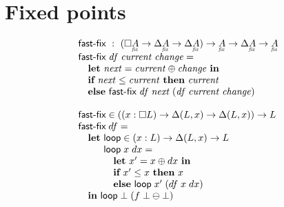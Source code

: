\documentclass{article}
\begin{document}



\section{Fixed points}

\[\begin{array}{l}
  \textsf{fast-fix} ~:~
  (\Disc{\fixtype{A}} \to \Ch\fixtype{A} \to \Ch\fixtype{A})
  \to \fixtype{A} \to \Ch\fixtype{A} \to \fixtype{A}\\
  \textsf{fast-fix}\; \mi{df}\; \mi{current}\; \mi{change} =\\
  \quad \textbf{let}~ {\mi{next} = \mi{current} \oplus \mi{change}}
  ~\textbf{in}\\
  \quad \textbf{if}~ \mi{next} \le \mi{current}
  ~\textbf{then}~ \mi{current}\\
  \quad \textbf{else}~ \textsf{fast-fix}\; \mi{df}\; \mi{next}
  \;(\mi{df}\; \mi{current}\; \mi{change})\\
  \\
  \textsf{fast-fix}
  \in ((x : \Disc{L}) \to \Delta(L, x) \to \Delta(L, x)) \to L
  \\
  \textsf{fast-fix} \; df =\\
  \quad\textbf{let}~ \textsf{loop} \in (x : L) \to \Delta(L, x) \to L\\
  \quad\phantom{\textbf{let}~} \textsf{loop} \;x \;dx =\\
  \quad\phantom{\textbf{let}~}\quad
  \textbf{let}~ x' = x \oplus dx ~\textbf{in}\\
  \quad\phantom{\textbf{let}~}\quad
  \textbf{if}~ x' \le x ~\textbf{then}~ x\\
  \quad\phantom{\textbf{let}~}\quad
  \textbf{else}~\textsf{loop} \;x' \;(df \; x \; dx)\\
  \quad\textbf{in}~ \textsf{loop} \; \unit \; (f \; \unit \ominus \unit)
\end{array}\]
\end{document}
